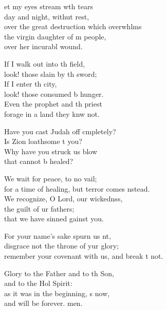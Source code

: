 \settowidth{\versewidth}{remember your covenant with us, and break it not.}
\begin{psalmverse}%
  \begin{patverse}
et my eyes stream w\pointup{\i}th tears\Med\\
day and night, withut rest,\\
over the great destruction which overwhlms\Flex\\
the virgin daughter of m people,\Med\\
over her incurabl wound.

If I walk out into th field,\Med\\
look! those slain by th sword;\\
If I enter th city,\Med\\
look! those consumed b hunger.\\
Even the prophet and th priest\Med\\
forage in a land they knw not.

Have you cast Judah off cmpletely?\Med\\
Is Zion loathsome t you?\\
Why have you struck us  blow\Med\\
that cannot b healed?

We wait for peace, to no vail;\Med\\
for a time of healing, but terror comes \pointup{\i}nstead.\\
We recognize, O Lord, our wickednss,\Flex\\
the guilt of ur fathers;\Med\\
that we have sinned gainst you.

For your name’s sake spurn us nt,\Flex\\
disgrace not the throne of yur glory;\Med\\
remember your covenant with us, and break \pointup{\i}t not.

Glory to the Father and to th Son,\Med\\
and to the Hol Spirit:\\
as it was in the beginning, \pointup{\i}s now,\Med\\
and will be forever. men.
  \end{patverse}
\end{psalmverse}
